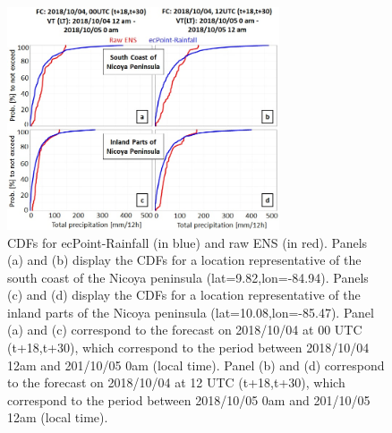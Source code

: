 \documentclass[twocol]{ametsocV5} %
\begin{document}
\begin{figure}
\centerline{\includegraphics[width=19pc]{manuscript/Figures/Fig8.jpg}}
\caption{CDFs for ecPoint-Rainfall (in blue) and raw ENS (in red). Panels (a) and (b) display the CDFs for a location representative of the south coast of the Nicoya peninsula (lat=9.82,lon=-84.94). Panels (c) and (d) display the CDFs for a location representative of the inland parts of the Nicoya peninsula (lat=10.08,lon=-85.47). Panel (a) and (c) correspond to the forecast on 2018/10/04 at 00 UTC (t+18,t+30), which correspond to the period between 2018/10/04 12am and 201/10/05 0am (local time). Panel (b) and (d) correspond to the forecast on 2018/10/04 at 12 UTC (t+18,t+30), which correspond to the period between 2018/10/05 0am and 201/10/05 12am (local time).}
\label{Fig8}
\end{figure}
\end{document}

